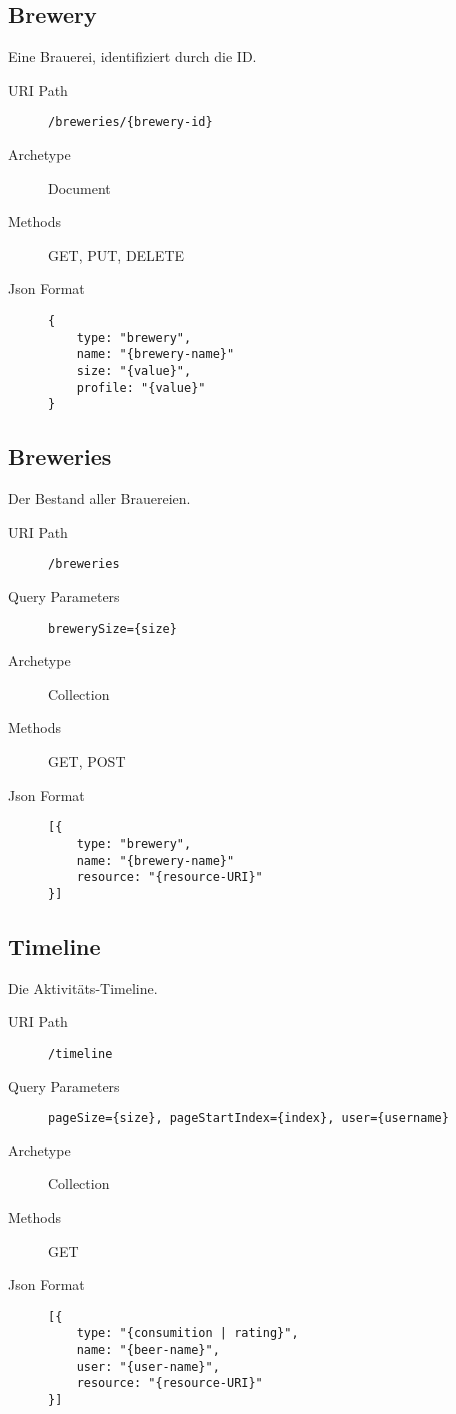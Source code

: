 \documentclass[10pt,a4paper]{scrartcl}
\begin{document}
\subsection{Brewery}

Eine Brauerei, identifiziert durch die ID.

\begin{description}
	\item[URI Path] \texttt{/breweries/\{brewery-id\}}
	\item[Archetype] Document
	\item[Methods] GET, PUT, DELETE
	\item[Json Format] \hfill
\begin{lstlisting}
{	
	type: "brewery",
	name: "{brewery-name}"
	size: "{value}",
	profile: "{value}"
}
\end{lstlisting}
\end{description}


\subsection{Breweries}

Der Bestand aller Brauereien.

\begin{description}
	\item[URI Path] \texttt{/breweries}
	\item[Query Parameters] \texttt{brewerySize=\{size\}}
	\item[Archetype] Collection
	\item[Methods] GET, POST
	\item[Json Format] \hfill
\begin{lstlisting}
[{	
	type: "brewery",
	name: "{brewery-name}"
	resource: "{resource-URI}"
}]
\end{lstlisting}
\end{description}


\subsection{Timeline}

Die Aktivitäts-Timeline.

\begin{description}
 	\item[URI Path] \texttt{/timeline}
	\item[Query Parameters] \texttt{pageSize=\{size\}, pageStartIndex=\{index\}, user=\{username\}}
	\item[Archetype] Collection
	\item[Methods] GET
	\item[Json Format] \hfill
\begin{lstlisting}
[{	
	type: "{consumition | rating}",
	name: "{beer-name}",
	user: "{user-name}",
	resource: "{resource-URI}"
}]
\end{lstlisting}
\end{description}
\end{document}

